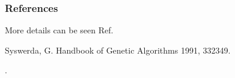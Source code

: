 \documentclass[letterpaper,10pt,english]{sphinxmanual}
\begin{document}
\begin{fulllineitems}
\begin{quote}
\begin{description}
\begin{description}
\end{description}

\end{description}\end{quote}
\subsubsection*{References}

\sphinxAtStartPar
More details can be seen Ref. %
\begin{footnote}[5]\sphinxAtStartFootnote
Syswerda, G. Handbook of Genetic Algorithms 1991, 332\sphinxhyphen{}349.
%
\end{footnote}.

\end{fulllineitems}

\end{document}
